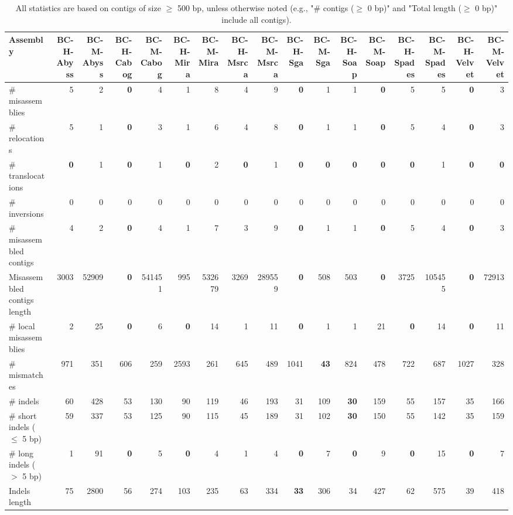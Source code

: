 \documentclass[12pt,a4paper]{article}
\begin{document}
\begin{table}[ht]
\begin{center}
\caption{All statistics are based on contigs of size $\geq$ 500 bp, unless otherwise noted (e.g., "\# contigs ($\geq$ 0 bp)" and "Total length ($\geq$ 0 bp)" include all contigs).}
\begin{tabular}{|l*{16}{|r}|}
\hline
Assembly & BC-H-Abyss & BC-M-Abyss & BC-H-Cabog & BC-M-Cabog & BC-H-Mira & BC-M-Mira & BC-H-Msrca & BC-M-Msrca & BC-H-Sga & BC-M-Sga & BC-H-Soap & BC-M-Soap & BC-H-Spades & BC-M-Spades & BC-H-Velvet & BC-M-Velvet \\ \hline
\# misassemblies & 5 & 2 & {\bf 0} & 4 & 1 & 8 & 4 & 9 & {\bf 0} & 1 & 1 & {\bf 0} & 5 & 5 & {\bf 0} & 3 \\ \hline
\hspace{5mm}\# relocations & 5 & 1 & {\bf 0} & 3 & 1 & 6 & 4 & 8 & {\bf 0} & 1 & 1 & {\bf 0} & 5 & 4 & {\bf 0} & 3 \\ \hline
\hspace{5mm}\# translocations & {\bf 0} & 1 & {\bf 0} & 1 & {\bf 0} & 2 & {\bf 0} & 1 & {\bf 0} & {\bf 0} & {\bf 0} & {\bf 0} & {\bf 0} & 1 & {\bf 0} & {\bf 0} \\ \hline
\hspace{5mm}\# inversions & 0 & 0 & 0 & 0 & 0 & 0 & 0 & 0 & 0 & 0 & 0 & 0 & 0 & 0 & 0 & 0 \\ \hline
\# misassembled contigs & 4 & 2 & {\bf 0} & 4 & 1 & 7 & 3 & 9 & {\bf 0} & 1 & 1 & {\bf 0} & 5 & 4 & {\bf 0} & 3 \\ \hline
Misassembled contigs length & 3003 & 52909 & {\bf 0} & 541451 & 995 & 532679 & 3269 & 289559 & {\bf 0} & 508 & 503 & {\bf 0} & 3725 & 105455 & {\bf 0} & 72913 \\ \hline
\# local misassemblies & 2 & 25 & {\bf 0} & 6 & {\bf 0} & 14 & 1 & 11 & {\bf 0} & 1 & 1 & 21 & {\bf 0} & 14 & {\bf 0} & 11 \\ \hline
\# mismatches & 971 & 351 & 606 & 259 & 2593 & 261 & 645 & 489 & 1041 & {\bf 43} & 824 & 478 & 722 & 687 & 1027 & 328 \\ \hline
\# indels & 60 & 428 & 53 & 130 & 90 & 119 & 46 & 193 & 31 & 109 & {\bf 30} & 159 & 55 & 157 & 35 & 166 \\ \hline
\hspace{5mm}\# short indels ($\leq$ 5 bp) & 59 & 337 & 53 & 125 & 90 & 115 & 45 & 189 & 31 & 102 & {\bf 30} & 150 & 55 & 142 & 35 & 159 \\ \hline
\hspace{5mm}\# long indels ($>$ 5 bp) & 1 & 91 & {\bf 0} & 5 & {\bf 0} & 4 & 1 & 4 & {\bf 0} & 7 & {\bf 0} & 9 & {\bf 0} & 15 & {\bf 0} & 7 \\ \hline
Indels length & 75 & 2800 & 56 & 274 & 103 & 235 & 63 & 334 & {\bf 33} & 306 & 34 & 427 & 62 & 575 & 39 & 418 \\ \hline
\end{tabular}
\end{center}
\end{table}
\end{document}
